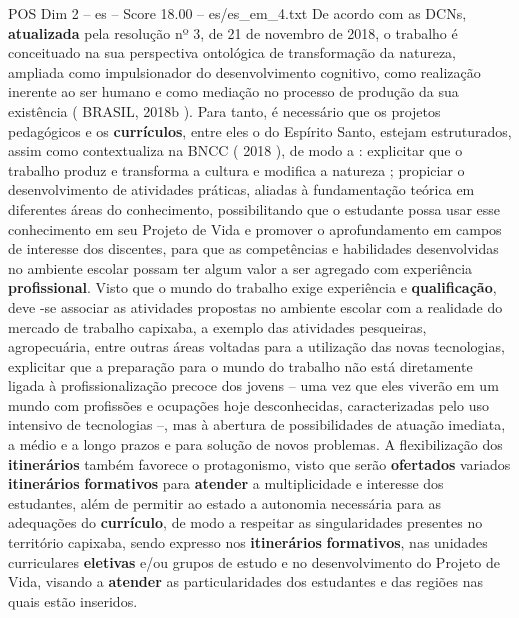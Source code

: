 \begin{textsample}{POS Dim 2 – es – Score 18.00 – es/es\_em\_4.txt}
De acordo com as DCNs, \textbf{atualizada} pela resolução nº 3, de 21 de novembro de 2018, o trabalho é conceituado na sua perspectiva ontológica de transformação da natureza, ampliada como impulsionador do desenvolvimento cognitivo, como realização inerente ao ser humano e como mediação no processo de produção da sua existência ( BRASIL, 2018b ).
Para tanto, é necessário que os projetos pedagógicos e os \textbf{currículos}, entre eles o do Espírito Santo, estejam estruturados, assim como contextualiza na BNCC ( 2018 ), de modo a : explicitar que o trabalho produz e transforma a cultura e modifica a natureza ; propiciar o desenvolvimento de atividades práticas, aliadas à fundamentação teórica em diferentes áreas do conhecimento, possibilitando que o estudante possa usar esse conhecimento em seu Projeto de Vida e promover o aprofundamento em campos de interesse dos discentes, para que as competências e habilidades desenvolvidas no ambiente escolar possam ter algum valor a ser agregado com experiência \textbf{profissional}.
Visto que o mundo do trabalho exige experiência e \textbf{qualificação}, deve -se associar as atividades propostas no ambiente escolar com a realidade do mercado de trabalho capixaba, a exemplo das atividades pesqueiras, agropecuária, entre outras áreas voltadas para a utilização das novas tecnologias, explicitar que a preparação para o mundo do trabalho não está diretamente ligada à profissionalização precoce dos jovens – uma vez que eles viverão em um mundo com profissões e ocupações hoje desconhecidas, caracterizadas pelo uso intensivo de tecnologias –, mas à abertura de possibilidades de atuação imediata, a médio e a longo prazos e para solução de novos problemas.
A flexibilização dos \textbf{itinerários} também favorece o protagonismo, visto que serão \textbf{ofertados} variados \textbf{itinerários} \textbf{formativos} para \textbf{atender} a multiplicidade e interesse dos estudantes, além de permitir ao estado a autonomia necessária para as adequações do \textbf{currículo}, de modo a respeitar as singularidades presentes no território capixaba, sendo expresso nos \textbf{itinerários} \textbf{formativos}, nas unidades curriculares \textbf{eletivas} e/ou grupos de estudo e no desenvolvimento do Projeto de Vida, visando a \textbf{atender} as particularidades dos estudantes e das regiões nas quais estão inseridos.

\end{textsample}
